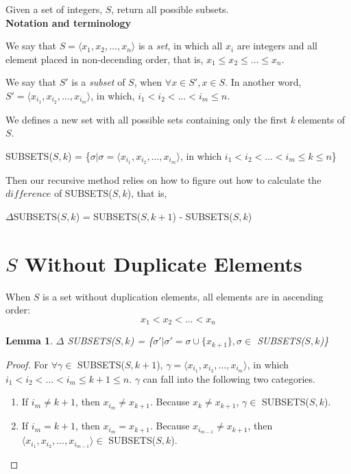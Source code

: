 \documentclass[a4paper, titlepage]{article}
\newtheorem{Lemma}{Lemma}
\begin{document}
Given a set of integers, $S$, return all possible subsets. \\

\textbf{Notation and terminology}

We say that $S = \langle x_1, x_2, \dots, x_n \rangle$ is a \emph{set}, in which all $x_i$ are integers and all element placed in non-decending order, that is, $ x_1 \leq x_2 \leq \dots \leq x_n $.


We say that $S'$ is a \emph{subset} of $S$, when $\forall x \in S', x \in S$. In another word,
$S' = \langle x_{i_1}, x_{i_2}, \dots, x_{i_m} \rangle$, in which, $i_1 < i_2 < \dots < i_m \leq n$.

We defines a new set with all possible sets containing only the first \emph{k} elements of $S$.

SUBSETS($S,k$) = \{$\sigma | \sigma = \langle x_{i_1}, x_{i_2}, \dots, x_{i_m} \rangle$, in which $ i_1 < i_2 < \dots < i_m \leq k \leq n$\}

Then our recursive method relies on how to figure out how to calculate the $difference$ of SUBSETS($S, k$), that is,

$\Delta$SUBSETS($S,k$) = SUBSETS($S, k+1$) - SUBSETS($S, k$)

\section{$S$ Without Duplicate Elements}
When $S$ is a set without duplication elements, all elements are in ascending order:
\[
 x_1 < x_2 < \dots < x_n 
\]


\begin{Lemma}\label{lemma: without dup}
$\Delta$ \textup{SUBSETS}($S, k$) = \{$\sigma' | \sigma' = \sigma \cup \{x_{k+1}\}, \sigma \in$ \textup{SUBSETS}($S, k$)\}
\end{Lemma}
\begin{proof}
For $\forall \gamma \in$ SUBSETS($S, k+1$), $\gamma = \langle x_{i_1}, x_{i_2}, \dots, x_{i_m} \rangle$, in which $ i_1 < i_2 < \dots < i_m \leq k + 1 \leq n$.
$\gamma$ can fall into the following two categories.

\begin{enumerate}
\item If $i_m \neq k+1$, then $x_{i_m} \neq x_{k+1}$. Because $x_k \neq x_{k+1}$, $\gamma \in$ SUBSETS($S, k$).

\item If $i_m = k+1$, then $x_{i_m} = x_{k+1}$. Because $x_{i_{m-1}} \neq x_{k+1}$, then $\langle x_{i_1}, x_{i_2}, \dots, x_{i_{m-1}}\rangle \in$ SUBSETS($S, k$). 
\end{enumerate}
\end{proof}
\end{document}
